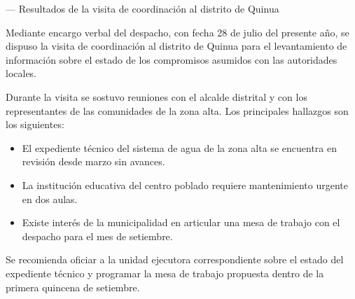 \documentclass{informe}
\begin{document}
\numerodocumento

  { — }
  {Resultados de la visita de coordinación al distrito de Quinua}


Mediante encargo verbal del despacho, con fecha 28 de julio del presente
año, se dispuso la visita de coordinación al distrito de Quinua para el
levantamiento de información sobre el estado de los compromisos asumidos
con las autoridades locales.


Durante la visita se sostuvo reuniones con el alcalde distrital y con
los representantes de las comunidades de la zona alta. Los principales
hallazgos son los siguientes:

\begin{itemize}
  \item El expediente técnico del sistema de agua de la zona alta se
        encuentra en revisión desde marzo sin avances.
  \item La institución educativa del centro poblado requiere
        mantenimiento urgente en dos aulas.
  \item Existe interés de la municipalidad en articular una mesa de
        trabajo con el despacho para el mes de setiembre.
\end{itemize}


Se recomienda oficiar a la unidad ejecutora correspondiente sobre el
estado del expediente técnico y programar la mesa de trabajo propuesta
dentro de la primera quincena de setiembre.

\atentamente
\bloquefirma[1.8cm]
\end{document}
